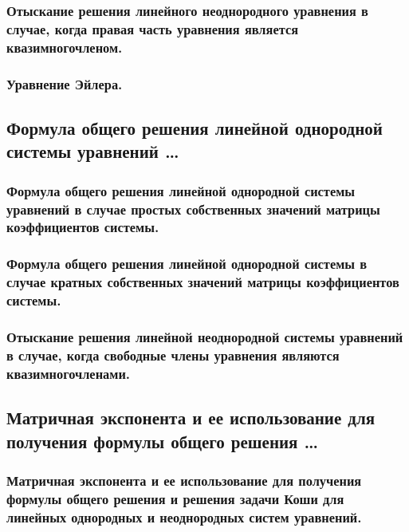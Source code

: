 \subsubsection{Отыскание решения линейного неоднородного уравнения в случае, когда правая часть уравнения является квазимногочленом.}

\subsubsection{Уравнение Эйлера.}

\newpage 
\subsection{Формула общего решения линейной однородной системы уравнений \dots}
\subsubsection{Формула общего решения линейной однородной системы уравнений в случае простых собственных значений матрицы коэффициентов системы.}

\subsubsection{Формула общего решения линейной однородной системы в случае кратных собственных значений матрицы коэффициентов системы.}

\subsubsection{Отыскание решения линейной неоднородной системы уравнений в случае, когда свободные члены уравнения являются квазимногочленами. }

\newpage 
\subsection{Матричная экспонента и ее использование для получения формулы общего решения \dots}

\subsubsection{Матричная экспонента и ее использование для получения формулы общего решения и решения задачи Коши для линейных однородных и неоднородных систем уравнений.}